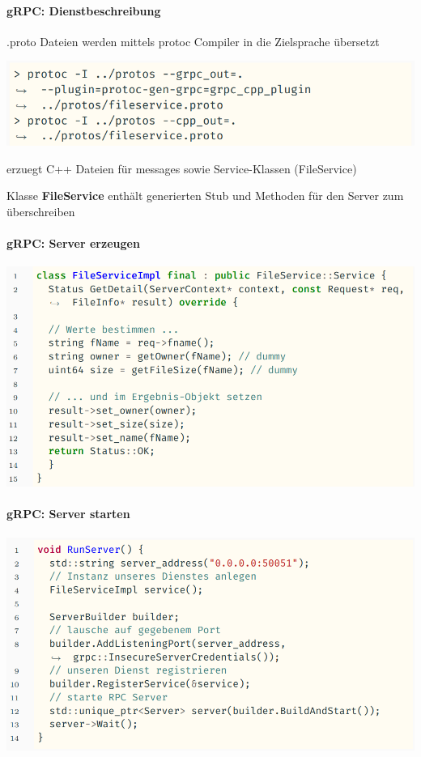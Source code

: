 \documentclass[10pt]{article}
\begin{document}
\paragraph{gRPC: Dienstbeschreibung}

\begin{itemize*}
  \item *.proto Dateien werden mittels protoc Compiler in die Zielsprache übersetzt
  \begin{center}
    \includegraphics[width=0.4\linewidth]{Assets/Programmierparadigmen-code-snippet-85}
  \end{center}
  \item erzuegt C++ Dateien für messages sowie Service-Klassen (FileService)
  \item Klasse \textbf{FileService} enthält generierten Stub und  Methoden für den Server zum überschreiben
\end{itemize*}

\paragraph{gRPC: Server erzeugen}

\begin{center}
  \includegraphics[width=0.4\linewidth]{Assets/Programmierparadigmen-code-snippet-86}
\end{center}

\paragraph{gRPC: Server starten}

\begin{center}
  \includegraphics[width=0.65\linewidth]{Assets/Programmierparadigmen-code-snippet-87}
\end{center}
\end{document}
